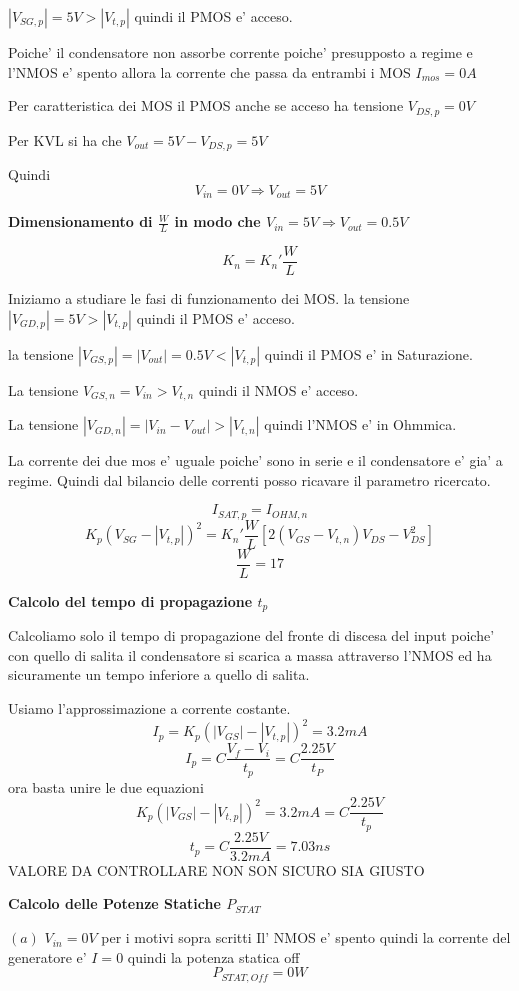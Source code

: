 \documentclass[\main/main.tex]{subfiles}
\begin{document}
$|V_{SG,p}| = 5V > |V_{t,p}|$ quindi il PMOS e' acceso.

Poiche' il condensatore non assorbe corrente poiche' presupposto a regime e l'NMOS e' spento allora la corrente che passa da entrambi i MOS $I_{mos} = 0A$

Per caratteristica dei MOS il PMOS anche se acceso ha tensione $V_{DS,p} = 0V$

Per KVL si ha che $V_{out} = 5V - V_{DS,p} = 5V$

Quindi \[ V_{in} = 0V \Rightarrow V_{out} = 5V\]

\textbf{Dimensionamento di $\frac{W}{L}$ in modo che $V_{in} = 5V \Rightarrow V_{out} = 0.5V$}

\[ K_n = K_n' \frac{W}{L} \]

Iniziamo a studiare le fasi di funzionamento dei MOS.
la tensione $|V_{GD,p}| = 5V > |V_{t,p}|$ quindi il PMOS e' acceso.

la tensione $|V_{GS,p}| = |V_{out}| = 0.5V < |V_{t,p}|$ quindi il PMOS e' in Saturazione.

La tensione $V_{GS,n} = V_{in} > V_{t,n}$ quindi il NMOS e' acceso.

La tensione $|V_{GD,n}| = |V_{in} - V_{out}| > |V_{t,n}|$ quindi l'NMOS e' in Ohmmica.

La corrente dei due mos e' uguale poiche' sono in serie e il condensatore e' gia' a regime.
Quindi dal bilancio delle correnti posso ricavare il parametro ricercato.

\[I_{SAT,p} = I_{OHM,n}\]
\[K_p \left(V_{SG} - |V_{t,p}| \right)^2 = K_n' \frac{W}{L} \left[ 2 \left( V_{GS} - V_{t,n} \right) V_{DS} - V_{DS}^2 \right]\]
\[\frac{W}{L} = 17\]

\textbf{Calcolo del tempo di propagazione $t_p$}

Calcoliamo solo il tempo di propagazione del fronte di discesa del input poiche' con quello di salita il condensatore si scarica a massa attraverso l'NMOS ed ha sicuramente un tempo inferiore a quello di salita.

Usiamo l'approssimazione a corrente costante.
\[I_p = K_p \left(|V_{GS}| - |V_{t,p}| \right)^2 = 3.2mA\]
\[I_p = C \frac{V_f - V_i}{t_p} = C \frac{2.25V}{t_P}\]
ora basta unire le due equazioni
\[ K_p \left(|V_{GS}| - |V_{t,p}| \right)^2 = 3.2mA = C \frac{2.25V}{t_p}\]
\[t_p = C \frac{2.25V}{3.2mA} = 7.03ns\]
VALORE DA CONTROLLARE NON SON SICURO SIA GIUSTO

\textbf{Calcolo delle Potenze Statiche $P_{STAT}$}

$(a)$ $V_{in} = 0V$ per i motivi sopra scritti Il' NMOS e' spento quindi la corrente del generatore e' $I = 0$ quindi la potenza statica off
\[P_{STAT,Off} = 0W\]
\end{document}
